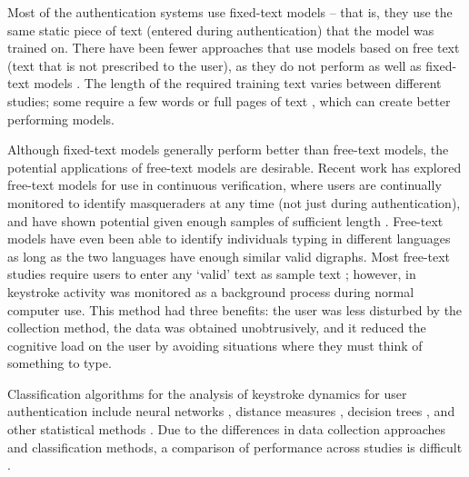 \begin{flushleft}
Most of the authentication systems \cite{bergadano, joyce, monrose} use fixed-text
models – that is, they use the same static piece of text
(entered during authentication) that the model was trained
on. There have been fewer approaches \cite{dowland, gunetti, monrose} that use
models based on free text (text that is not prescribed to the
user), as they do not perform as well as fixed-text models
\cite{monrose}. The length of the required training text varies between
different studies; some require a few words \cite{bergadano} or full pages
of text \cite{gaines}, which can create better performing models.


Although fixed-text models generally perform better than
free-text models, the potential applications of free-text
models are desirable. Recent work has explored free-text
models for use in continuous verification, where users are
continually monitored to identify masqueraders at any time
(not just during authentication), and have shown potential given enough samples of sufficient length \cite{gunetti}. Free-text
models have even been able to identify individuals typing
in different languages \cite{gunetti2} as long as the two languages
have enough similar valid digraphs. Most free-text studies
require users to enter any ‘valid’ text as sample text \cite{gunetti};
however, in \cite{dowland} keystroke activity was monitored as a
background process during normal computer use. This
method had three benefits: the user was less disturbed by
the collection method, the data was obtained unobtrusively,
and it reduced the cognitive load on the user by avoiding
situations where they must think of something to type.


Classification algorithms for the analysis of keystroke
dynamics for user authentication include neural networks
\cite{brown}, distance measures \cite{joyce, monrose}, decision trees \cite{sheng}, and
other statistical methods \cite{bergadano, dowland, monrose}. Due to the differences in
data collection approaches and classification methods, a
comparison of performance across studies is difficult \cite{bergadano}.


\end{flushleft}
